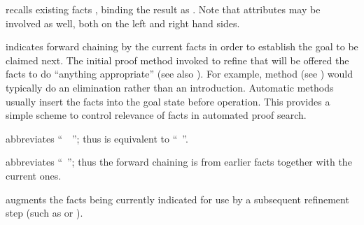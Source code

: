 \begin{isabellebody}
\begin{isamarkuptext}
  \begin{descr}

  \item [\mbox{\isa{\isacommand{note}}}~\isa{{\isachardoublequote}a\ {\isacharequal}\ b\isactrlsub {\isadigit{1}}\ {\isasymdots}\ b\isactrlsub n{\isachardoublequote}}]
  recalls existing facts , binding
  the result as .  Note that attributes may be involved as
  well, both on the left and right hand sides.

  \item [\mbox{\isa{\isacommand{then}}}] indicates forward chaining by the current
  facts in order to establish the goal to be claimed next.  The
  initial proof method invoked to refine that will be offered the
  facts to do ``anything appropriate'' (see also
  ).  For example, method \mbox{}
  (see ) would typically do an elimination
  rather than an introduction.  Automatic methods usually insert the
  facts into the goal state before operation.  This provides a simple
  scheme to control relevance of facts in automated proof search.
  
  \item [\mbox{\isa{\isacommand{from}}}~\isa{b}] abbreviates ``\mbox{}~~\mbox{}''; thus \mbox{} is
  equivalent to ``\mbox{}~''.
  
  \item [\mbox{\isa{\isacommand{with}}}~\isa{{\isachardoublequote}b\isactrlsub {\isadigit{1}}\ {\isasymdots}\ b\isactrlsub n{\isachardoublequote}}]
  abbreviates ``\mbox{}~''; thus the forward chaining is from earlier facts together
  with the current ones.
  
  \item [\mbox{\isa{\isacommand{using}}}~\isa{{\isachardoublequote}b\isactrlsub {\isadigit{1}}\ {\isasymdots}\ b\isactrlsub n{\isachardoublequote}}] augments
  the facts being currently indicated for use by a subsequent
  refinement step (such as \mbox{} or \mbox{}).
  

\end{descr}
\end{isamarkuptext}
\end{isabellebody}
